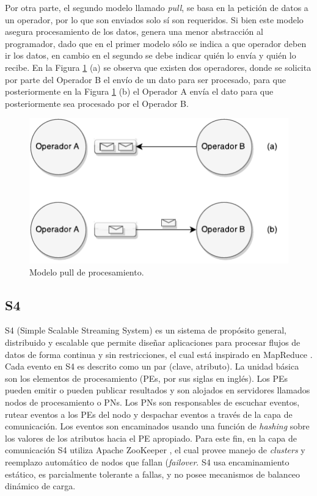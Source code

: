 Por otra parte, el segundo modelo llamado \textit{pull}, se basa en la petición de datos a un operador, por lo que son enviados solo sí son requeridos. Si bien este modelo asegura procesamiento de los datos, genera una menor abstracción al programador, dado que en el primer modelo sólo se indica a que operador deben ir los datos, en cambio en el segundo se debe indicar quién lo envía y quién lo recibe. En la Figura \ref{fig:sps-pull} (a) se observa que existen dos operadores, donde se solicita por parte del Operador B el envío de un dato para ser procesado, para que posteriormente en la Figura \ref{fig:sps-pull} (b) el Operador A envía el dato para que posteriormente sea procesado por el Operador B.

\begin{figure}[ht!]
  \centering
    \includegraphics[scale=1]{images/SPS-Pull.pdf}
  \caption{Modelo pull de procesamiento.}
  \label{fig:sps-pull}
\end{figure}

\subsection{S4}
S4 (Simple Scalable Streaming System) \citep{s4yahoo} es un sistema de propósito general, distribuido y escalable que permite diseñar aplicaciones para procesar flujos de datos de forma continua y sin restricciones, el cual está inspirado en MapReduce \citep{2010Lin}. Cada evento en S4 es descrito como un par (clave, atributo). La unidad básica son los elementos de procesamiento (PEs, por sus siglas en inglés). Los PEs pueden emitir o pueden publicar resultados y son alojados en servidores llamados nodos de procesamiento o PNs. Los PNs son responsables de escuchar eventos, rutear eventos a los PEs del nodo y despachar eventos a través de la capa de comunicación. Los eventos son encaminados usando una función de \textsl{hashing} sobre los valores de los atributos hacia el PE apropiado. Para este fin, en la capa de comunicación S4 utiliza Apache ZooKeeper \citep{HuntKJR10}, el cual provee manejo de \textit{clusters} y reemplazo automático de nodos que fallan (\textit{failover}. S4 usa encaminamiento estático, es parcialmente tolerante a fallas, y no posee mecanismos de balanceo dinámico de carga.

